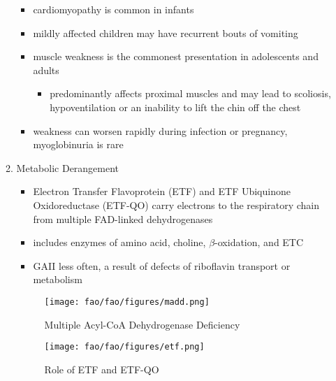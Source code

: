 \documentclass{scrartcl}
\begin{document}
\begin{enumerate}
\begin{enumerate}
\begin{itemize}
\begin{itemize}
\end{itemize}
\item cardiomyopathy is common in infants
\item mildly affected children may have recurrent bouts of vomiting
\item muscle weakness is the commonest presentation in adolescents and adults
\begin{itemize}
\item predominantly affects proximal muscles and may lead to scoliosis,
hypoventilation or an inability to lift the chin off the chest
\end{itemize}
\item weakness can worsen rapidly during infection or pregnancy, myoglobinuria is rare
\end{itemize}

\item Metabolic Derangement
\label{sec:org1759212}
\begin{itemize}
\item Electron Transfer Flavoprotein (ETF) and ETF Ubiquinone
Oxidoreductase (ETF-QO) carry electrons to the respiratory chain from
multiple FAD-linked dehydrogenases
\item includes enzymes of amino acid, choline, \(\beta\)-oxidation, and ETC

\item GAII less often, a result of defects of riboflavin transport or
metabolism
\end{itemize}

\begin{figure}[htbp]
\centering
\texttt{[image: fao/fao/figures/madd.png]}
\caption{\label{fig:org5734dd4}Multiple Acyl-CoA Dehydrogenase Deficiency}
\end{figure}

\begin{figure}[htbp]
\centering
\texttt{[image: fao/fao/figures/etf.png]}
\caption{\label{fig:org26228bf}Role of ETF and ETF-QO}
\end{figure}


\end{enumerate}
\end{enumerate}
\end{document}
